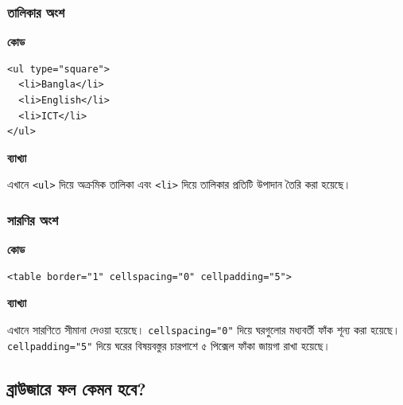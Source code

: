\subsubsection{তালিকার অংশ}

\par\noindent
\begin{minipage}[t]{.50\linewidth}\vspace{0pt}\small
\textbf{\color{chFourTeal}কোড}\par
\begin{verbatim}
<ul type="square">
  <li>Bangla</li>
  <li>English</li>
  <li>ICT</li>
</ul>
\end{verbatim}
\par\smallskip
\end{minipage}\hfill
\begin{minipage}[t]{.46\linewidth}\vspace{0pt}\small
\textbf{\color{chFourTeal}ব্যাখ্যা}\par
এখানে \texttt{<ul>} দিয়ে অক্রমিক তালিকা এবং \texttt{<li>} দিয়ে তালিকার প্রতিটি উপাদান তৈরি করা হয়েছে।
\end{minipage}\par
\subsubsection{সারণির অংশ}

\par\noindent
\begin{minipage}[t]{.54\linewidth}\vspace{0pt}\small
\textbf{\color{chFourTeal}কোড}\par
\begin{verbatim}
<table border="1" cellspacing="0" cellpadding="5">
\end{verbatim}
\par\smallskip
\end{minipage}\hfill
\begin{minipage}[t]{.42\linewidth}\vspace{0pt}\small
\textbf{\color{chFourTeal}ব্যাখ্যা}\par
এখানে সারণিতে সীমানা দেওয়া হয়েছে। \texttt{cellspacing="0"} দিয়ে ঘরগুলোর মধ্যবর্তী ফাঁক শূন্য করা হয়েছে। \texttt{cellpadding="5"} দিয়ে ঘরের বিষয়বস্তুর চারপাশে ৫ পিক্সেল ফাঁকা জায়গা রাখা হয়েছে।
\end{minipage}\par
\subsection{ব্রাউজারে ফল কেমন হবে?}


